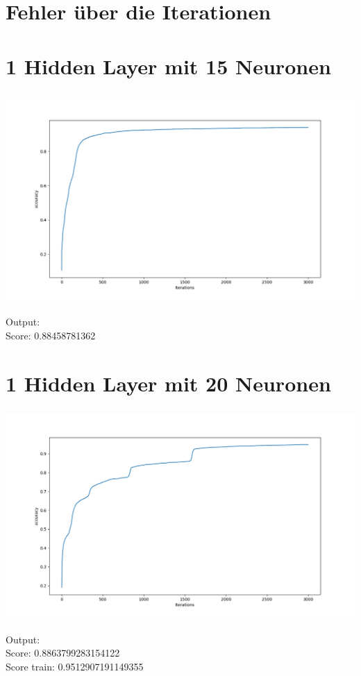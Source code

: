 \section*{Fehler über die Iterationen}

\section*{1 Hidden Layer mit 15 Neuronen}

\includegraphics[height=8cm]{./15inner.png}

Output: \\
Score: 0.88458781362

\section*{1 Hidden Layer mit 20 Neuronen}

\includegraphics[height=8cm]{./20inner.png}

Output: \\
Score: 0.8863799283154122 \\
Score train: 0.9512907191149355

